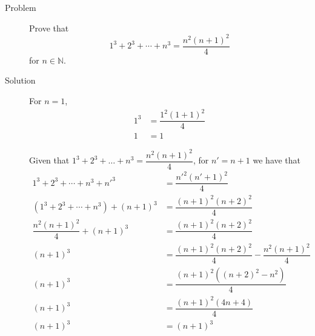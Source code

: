 \begin{description}
\item[Problem] Prove that
$$1^3 + 2^3 + \cdots + n^3 = \dfrac {n^2 (n+1)^2} 4$$
for $n \in \mathbb{N}$.

\item[Solution] For $n = 1$,
\begin{equation*}\begin{aligned}
1^3 &= \dfrac{1^2 (1 + 1)^2}{4} \\
1   &= 1
\end{aligned}\end{equation*}

Given that $1^3 + 2^3 + \ldots + n^3 = \dfrac{n^2(n+1)^2}{4}$, for $n' = n + 1$
we have that
\begin{equation*}\begin{aligned}
1^3 + 2^3 + \cdots + n^3 + n'^3 &= \dfrac{n'^2 (n' + 1)^2}{4} \\
(1^3 + 2^3 + \cdots + n^3) + (n+1)^3 &= \dfrac{(n+1)^2 (n+2)^2} 4 \\
\dfrac{n^2(n+1)^2}{4} + (n+1)^3 &= \dfrac{(n+1)^2 (n+2)^2} 4 \\
(n+1)^3 &= \dfrac{(n+1)^2 (n+2)^2} 4 - \dfrac{n^2(n+1)^2}{4} \\
(n+1)^3 &= \dfrac{(n+1)^2 \left((n+2)^2 - n^2\right)} 4 \\
(n+1)^3 &= \dfrac{(n+1)^2 \left(4n + 4\right)} 4 \\
(n+1)^3 &= (n+1)^3 \\
\end{aligned}\end{equation*}

\end{description}

